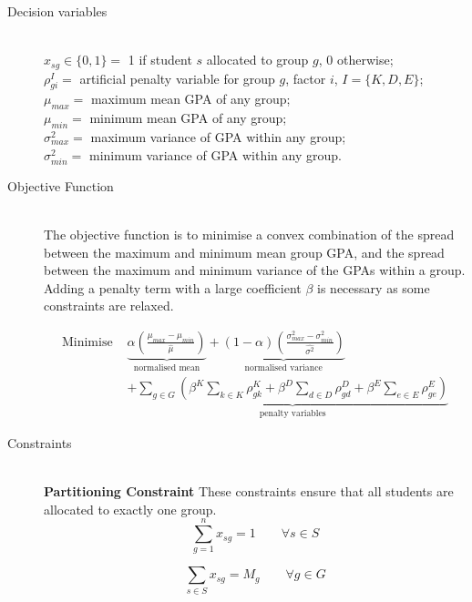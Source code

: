 \documentclass[12pt]{ORSNZ}
\begin{document}
\begin{description}
\item[Decision variables]\mbox{} \\
$x_{sg}\in\{0,1\} = $ 1 if student $s$ allocated to group $g$, 0 otherwise;\\
$\rho^I_{gi} = $ artificial penalty variable for group $g$, factor $i$, \qquad $I=\{K, D, E\}$;\\
$\mu_{max} = $ maximum mean GPA of any group;\\
$\mu_{min} = $ minimum mean GPA of any group;\\
$\sigma^2_{max} = $ maximum variance of GPA within any group;\\
$\sigma^2_{min} = $  minimum variance of GPA within any group.

\item[Objective Function]\mbox{} \\
The objective function is to minimise a convex combination of the spread between the maximum and minimum mean group GPA, and the spread between the maximum and minimum variance of the GPAs within a group. Adding a penalty term with a large coefficient $\beta$ is necessary as some constraints are relaxed.


\begin{equation}\begin{split}
\mbox{Minimise }&
\underbrace{\alpha\left(\frac{\mu_{max} - \mu_{min}}{\hat{\mu}}\right)}_{\mbox{normalised mean}} 
+ \underbrace{(1-\alpha)\left(\frac{\sigma^2_{max} - \sigma^2_{min}}{\hat{\sigma^2}}\right)}_{\mbox{normalised variance}}
\\&+ \underbrace{\sum_{g \in G}\left(\beta^K\sum_{k \in K}\rho^K_{gk} 
	+ \beta^D\sum_{d \in D}\rho^D_{gd} 
	+ \beta^E\sum_{e \in E}\rho^E_{ge}\right)}_{\mbox{penalty variables}}
\end{split}\end{equation}

\item[Constraints]\mbox{} \\
\textbf{Partitioning Constraint} These constraints ensure that all students are allocated to exactly one group.
\begin{equation} \label{con1}
\sum_{g=1}^n x_{sg} =  1 \qquad \mbox{$\forall s \in S$}
\end{equation}

\begin{equation} \label{con2}
\sum_{s \in S} x_{sg} =  M_g \qquad \mbox{$\forall g \in G$}
\end{equation}


\end{description}
\end{document}
